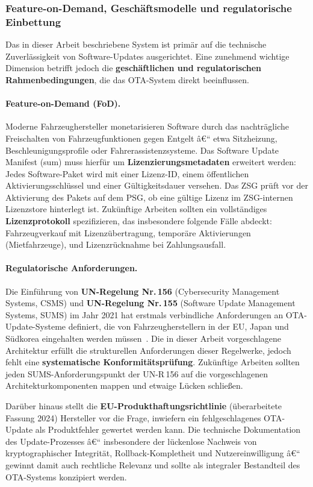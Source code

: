 ﻿\documentclass[12pt,a4paper,twoside]{article}
\begin{document}
\subsubsection{Feature-on-Demand, Geschäftsmodelle und regulatorische Einbettung}

Das in dieser Arbeit beschriebene System ist primär auf die technische
Zuverlässigkeit von Software-Updates ausgerichtet. Eine zunehmend
wichtige Dimension betrifft jedoch die \textbf{geschäftlichen und
regulatorischen Rahmenbedingungen}, die das OTA-System direkt beeinflussen.

\paragraph{Feature-on-Demand (FoD).}
Moderne Fahrzeughersteller monetarisieren Software durch das nachträgliche
Freischalten von Fahrzeugfunktionen gegen Entgelt â€“ etwa Sitzheizung,
Beschleunigungsprofile oder Fahrerassistenzsysteme. Das Software Update
Manifest (\gls{sum}) muss hierfür um \textbf{Lizenzierungsmetadaten}
erweitert werden: Jedes Software-Paket wird mit einer
Lizenz-ID, einem öffentlichen Aktivierungsschlüssel und
einer Gültigkeitsdauer versehen. Das ZSG prüft vor der Aktivierung
des Pakets auf dem PSG, ob eine gültige Lizenz im ZSG-internen
Lizenzstore hinterlegt ist. Zukünftige Arbeiten sollten ein
vollständiges \textbf{Lizenzprotokoll} spezifizieren, das
insbesondere folgende Fälle abdeckt: Fahrzeugverkauf mit
Lizenzübertragung, temporäre Aktivierungen (Mietfahrzeuge),
und Lizenzrücknahme bei Zahlungsausfall.

\paragraph{Regulatorische Anforderungen.}
Die Einführung von \textbf{UN-Regelung Nr.\,156} (Cybersecurity
Management Systems, CSMS) und \textbf{UN-Regelung Nr.\,155}
(Software Update Management Systems, SUMS) im Jahr 2021 hat erstmals
verbindliche Anforderungen an OTA-Update-Systeme definiert, die von
Fahrzeugherstellern in der EU, Japan und Südkorea eingehalten werden
müssen~\cite{iso21434}. Die in dieser Arbeit vorgeschlagene Architektur
erfüllt die strukturellen Anforderungen dieser Regelwerke, jedoch fehlt
eine \textbf{systematische Konformitätsprüfung}. Zukünftige Arbeiten
sollten jeden SUMS-Anforderungspunkt der UN-R\,156 auf die vorgeschlagenen
Architekturkomponenten mappen und etwaige Lücken schließen.

Darüber hinaus stellt die \textbf{EU-Produkthaftungsrichtlinie}
(überarbeitete Fassung 2024) Hersteller vor die Frage,
inwiefern ein fehlgeschlagenes OTA-Update als Produktfehler gewertet
werden kann. Die technische Dokumentation des Update-Prozesses â€“
insbesondere der lückenlose Nachweis von kryptographischer Integrität,
Rollback-Kompletheit und Nutzereinwilligung â€“ gewinnt damit auch
rechtliche Relevanz und sollte als integraler Bestandteil des
OTA-Systems konzipiert werden.
\end{document}
